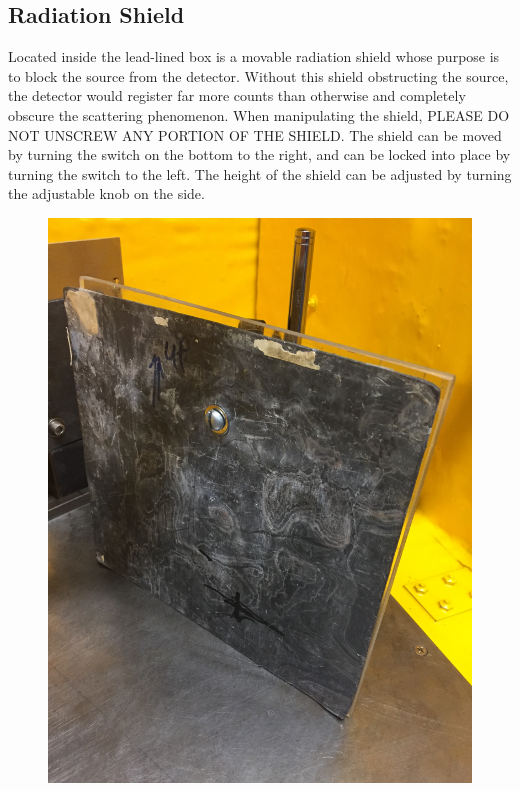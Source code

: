 \documentclass{../lab}
\begin{document}
\subsection{Radiation Shield}

Located inside the lead-lined box is a movable radiation shield whose purpose is to block the source from the detector. Without this shield obstructing the source, the detector would register far more counts than otherwise and completely obscure the scattering phenomenon. When manipulating the shield, PLEASE DO NOT UNSCREW ANY PORTION OF THE SHIELD. The shield can be moved by turning the switch on the bottom to the right, and can be locked into place by turning the switch to the left. The height of the shield can be adjusted by turning the adjustable knob on the side.

\begin{figure}[!h]
\begin{minipage}{.49\linewidth}
    \centering
    \href{http://experimentationlab.berkeley.edu/sites/default/files/Shield-Front.JPG}{\includegraphics[width=\linewidth,keepaspectratio]{images/Shield-Front.JPG}} \\

\end{minipage}
\end{figure}
\end{document}
